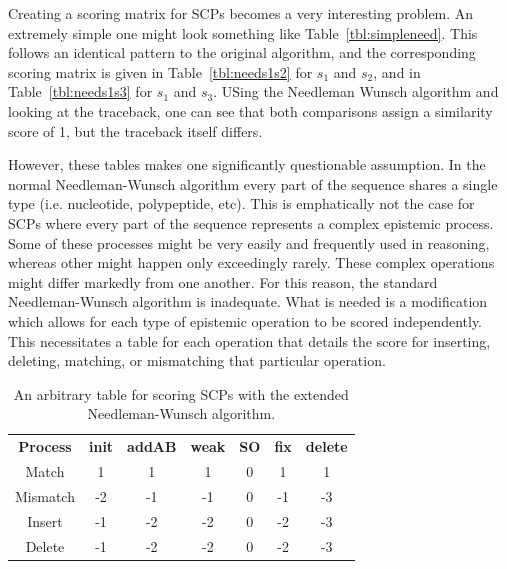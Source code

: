 \documentclass{article}
\begin{document}

Creating a scoring matrix for SCPs becomes a very interesting problem. An extremely simple one might look something like Table~\ref{tbl:simpleneed}. This follows an identical pattern to the original algorithm, and the corresponding scoring matrix is given in Table~\ref{tbl:needs1s2} for $s_1$ and $s_2$, and in Table~\ref{tbl:needs1s3} for $s_1$ and $s_3$. USing the Needleman Wunsch algorithm and looking at the traceback, one can see that both comparisons assign a similarity score of 1, but the traceback itself differs.

However, these tables makes one significantly questionable assumption. In the normal Needleman-Wunsch algorithm every part of the sequence shares a single type (i.e. nucleotide, polypeptide, etc). This is emphatically not the case for SCPs where every part of the sequence represents a complex epistemic process. Some of these processes might be very easily and frequently used in reasoning, whereas other might happen only exceedingly rarely. These complex operations might differ markedly from one another. For this reason, the standard Needleman-Wunsch algorithm is inadequate. What is needed is a modification which allows for each type of epistemic operation to be scored independently. This necessitates a table for each operation that details the score for inserting, deleting, matching, or mismatching that particular operation.


\begin{table}
\begin{center}

\begin{tabular}{ c c c c c c c}
 \textbf{Process} & \textbf{init} & \textbf{addAB} & \textbf{weak} & \textbf{SO} & \textbf{fix} & \textbf{delete}\\ 
 Match & 1 & 1 & 1 & 0 & 1 & 1\\
 Mismatch & -2 & -1 & -1 & 0 & -1 & -3\\
 Insert & -1 & -2 & -2 & 0 & -2 & -3\\
 Delete & -1 & -2 & -2 & 0 & -2 & -3
\end{tabular}
\caption{An arbitrary table for scoring SCPs with the extended Needleman-Wunsch algorithm.}
\label{tbl:arbneed}

\end{center}
\end{table}
\end{document}
